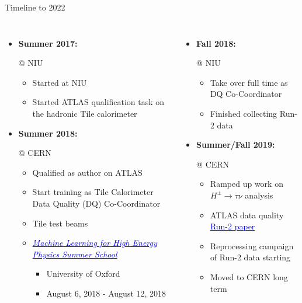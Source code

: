 \documentclass[aspectratio=169,xcolor=table]{beamer}
\newcommand{\Hp}{\ensuremath{H^{\pm}}\xspace}
\newcommand{\HpLong}{\ensuremath{\Hp \rightarrow \tau \nu}\xspace}
\begin{document}
  \begin{frame}[t]{Timeline to 2022}
    \begin{columns}
        \begin{itemize}
          \item \textbf{Summer 2017:}  {\footnotesize{@ NIU
            \begin{itemize}
              \item Started at NIU
              \item Started ATLAS qualification task on the hadronic Tile calorimeter
            \end{itemize}}}

          \item \textbf{Summer 2018: } {\footnotesize{@ CERN
            \begin{itemize}
              \item Qualified as author on ATLAS
              \item Start training as Tile Calorimeter Data Quality (DQ) Co-Coordinator 
              \item Tile test beams
              \item \href{https://indico.cern.ch/event/687473/}{\textcolor{blue}{\emph{Machine Learning for High Energy Physics Summer School}}}
              \begin{itemize}
                \item University of Oxford
                \item August 6, 2018 - August 12, 2018
              \end{itemize}
            \end{itemize}}}

        \end{itemize}

        \begin{itemize}
          \item \textbf{Fall 2018: } {\footnotesize{@ NIU
            \begin{itemize}
              \item Take over full time as DQ Co-Coordinator
              \item Finished collecting Run-2 data
            \end{itemize}}}

          \item \textbf{Summer/Fall 2019: } {\footnotesize{@ CERN
            \begin{itemize}
              \item Ramped up work on \HpLong analysis
              \item ATLAS data quality \href{https://arxiv.org/abs/1911.04632}{\textcolor{blue}{Run-2 paper}}
              \item Reprocessing campaign of Run-2 data starting
              \item Moved to CERN long term
            \end{itemize}}}


\end{itemize}
\end{columns}
\end{frame}
\end{document}

